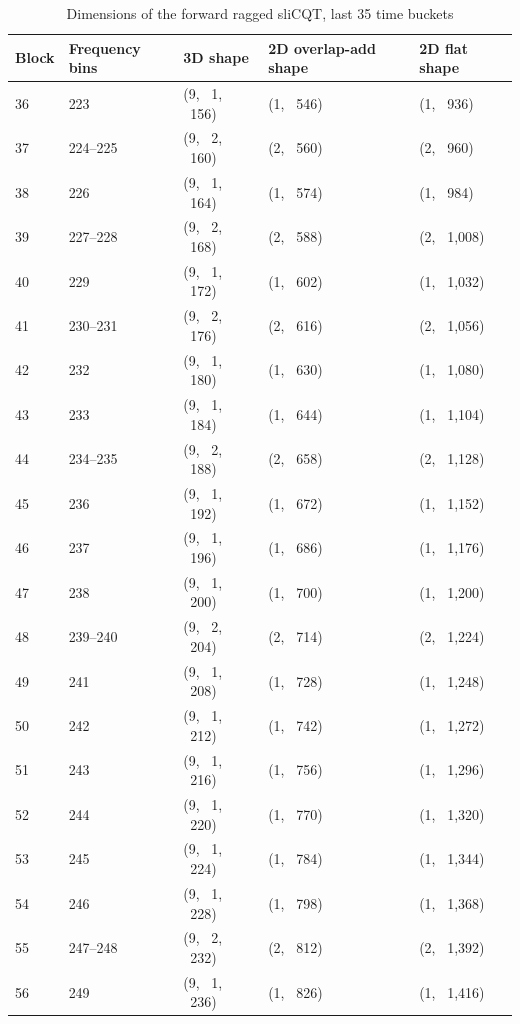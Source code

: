 \documentclass[report.tex]{subfiles}
\begin{document}
\begin{table}[ht]
	\centering
	\caption{Dimensions of the forward ragged sliCQT, last 35 time buckets}
	\label{table:slicqdim2}
	\begin{tabular}{ |l|l|l|l|l| }
	 \hline
		Block & Frequency bins & 3D shape & 2D overlap-add shape & 2D flat shape \\
	 \hline
	 \hline
\hline
36 & 223 & (9, \ 1, \ 156) & (1, \ 546) & (1, \ 936) \\
\hline
37 & 224--225 & (9, \ 2, \ 160) & (2, \ 560) & (2, \ 960) \\
\hline
38 & 226 & (9, \ 1, \ 164) & (1, \ 574) & (1, \ 984) \\
\hline
39 & 227--228 & (9, \ 2, \ 168) & (2, \ 588) & (2, \ 1,008) \\
\hline
40 & 229 & (9, \ 1, \ 172) & (1, \ 602) & (1, \ 1,032) \\
\hline
41 & 230--231 & (9, \ 2, \ 176) & (2, \ 616) & (2, \ 1,056) \\
\hline
42 & 232 & (9, \ 1, \ 180) & (1, \ 630) & (1, \ 1,080) \\
\hline
43 & 233 & (9, \ 1, \ 184) & (1, \ 644) & (1, \ 1,104) \\
\hline
44 & 234--235 & (9, \ 2, \ 188) & (2, \ 658) & (2, \ 1,128) \\
\hline
45 & 236 & (9, \ 1, \ 192) & (1, \ 672) & (1, \ 1,152) \\
\hline
46 & 237 & (9, \ 1, \ 196) & (1, \ 686) & (1, \ 1,176) \\
\hline
47 & 238 & (9, \ 1, \ 200) & (1, \ 700) & (1, \ 1,200) \\
\hline
48 & 239--240 & (9, \ 2, \ 204) & (2, \ 714) & (2, \ 1,224) \\
\hline
49 & 241 & (9, \ 1, \ 208) & (1, \ 728) & (1, \ 1,248) \\
\hline
50 & 242 & (9, \ 1, \ 212) & (1, \ 742) & (1, \ 1,272) \\
\hline
51 & 243 & (9, \ 1, \ 216) & (1, \ 756) & (1, \ 1,296) \\
\hline
52 & 244 & (9, \ 1, \ 220) & (1, \ 770) & (1, \ 1,320) \\
\hline
53 & 245 & (9, \ 1, \ 224) & (1, \ 784) & (1, \ 1,344) \\
\hline
54 & 246 & (9, \ 1, \ 228) & (1, \ 798) & (1, \ 1,368) \\
\hline
55 & 247--248 & (9, \ 2, \ 232) & (2, \ 812) & (2, \ 1,392) \\
\hline
56 & 249 & (9, \ 1, \ 236) & (1, \ 826) & (1, \ 1,416) \\

\end{tabular}
\end{table}
\end{document}
